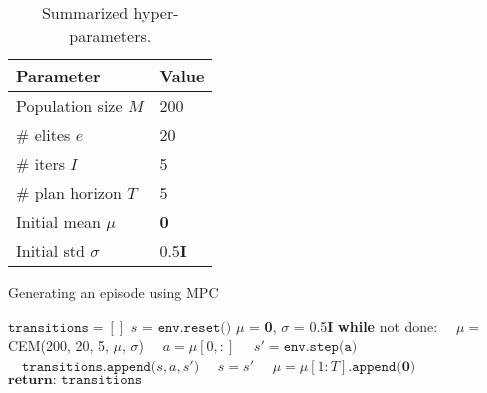 \documentclass[12pt]{article}
\begin{document}
\begin{table*}[h]\centering
\begin{tabular}{@{}lp{50mm}}
\toprule
Parameter & Value\\
\midrule
\hspace{5mm}Population size $M$ & 200 \\
\hspace{5mm}\# elites $e$ & 20 \\
\hspace{5mm}\# iters $I$ & 5 \\
\hspace{5mm}\# plan horizon $T$ & 5 \\
\hspace{5mm}Initial mean $\mu$ & \textbf{0} \\
\hspace{5mm}Initial std $\sigma$ & 0.5\textbf{I} \\
\bottomrule
\end{tabular}
\caption{Summarized hyper-parameters.}
\label{tab:hyper_params}
\end{table*}

\begin{algorithm}
\label{algompc}
\caption{Generating an episode using MPC\label{mpc}}
\begin{algorithmic}[1]
\State $\texttt{transitions} = []$
\State $s$ = $\texttt{env.reset()}$
\State $\mu$ = \textbf{0}, $\sigma$ = 0.5\textbf{I} 
\State \textbf{while} not done:
\State $\quad \mu=$CEM(200, 20, 5, $\mu$, $\sigma$)
\State $\quad a=\mu[0,:]$
\State $\quad s' = \texttt{env.step(a)}$
\State $\quad \texttt{transitions.append(}s, a, s'\texttt{)}$
\State $\quad s = s'$
\State $\quad \mu=\mu[1:T]\texttt{.append(}\textbf{0}\texttt{)}$
\State $\textbf{return: } \texttt{transitions}$
\EndProcedure
\end{algorithmic}
\end{algorithm}
\end{document}
